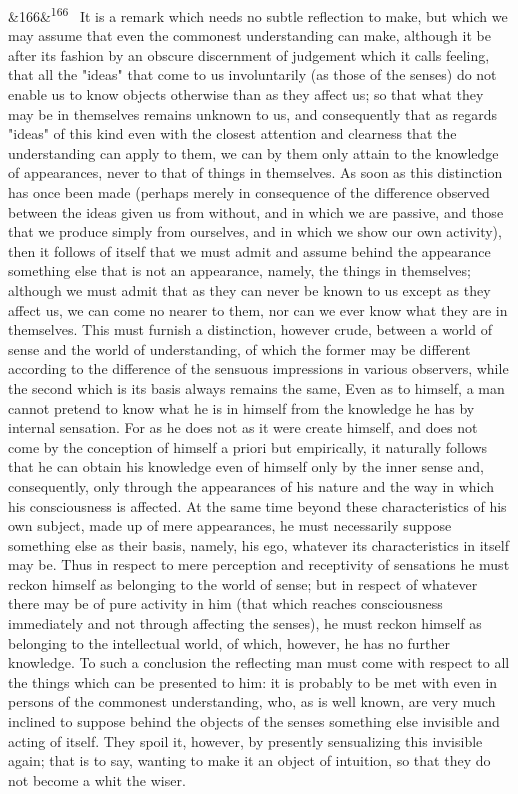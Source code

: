 \documentclass[12pt]{article}
\newcommand{\para}[1][]{\par\noindent\ifx&#1&\else\textsuperscript{\footnotesize #1}~\fi}
\begin{document}
\para[166] It is a remark which needs no subtle reflection to make, but which we may assume that even the commonest understanding can make, although it be after its fashion by an obscure discernment of judgement which it calls feeling, that all the "ideas" that come to us involuntarily (as those of the senses) do not enable us to know objects otherwise than as they affect us; so that what they may be in themselves remains unknown to us, and consequently that as regards "ideas" of this kind even with the closest attention and clearness that the understanding can apply to them, we can by them only attain to the knowledge of appearances, never to that of things in themselves. As soon as this distinction has once been made (perhaps merely in consequence of the difference observed between the ideas given us from without, and in which we are passive, and those that we produce simply from ourselves, and in which we show our own activity), then it follows of itself that we must admit and assume behind the appearance something else that is not an appearance, namely, the things in themselves; although we must admit that as they can never be known to us except as they affect us, we can come no nearer to them, nor can we ever know what they are in themselves. This must furnish a distinction, however crude, between a world of sense and the world of understanding, of which the former may be different according to the difference of the sensuous impressions in various observers, while the second which is its basis always remains the same, Even as to himself, a man cannot pretend to know what he is in himself from the knowledge he has by internal sensation. For as he does not as it were create himself, and does not come by the conception of himself a priori but empirically, it naturally follows that he can obtain his knowledge even of himself only by the inner sense and, consequently, only through the appearances of his nature and the way in which his consciousness is affected. At the same time beyond these characteristics of his own subject, made up of mere appearances, he must necessarily suppose something else as their basis, namely, his ego, whatever its characteristics in itself may be. Thus in respect to mere perception and receptivity of sensations he must reckon himself as belonging to the world of sense; but in respect of whatever there may be of pure activity in him (that which reaches consciousness immediately and not through affecting the senses), he must reckon himself as belonging to the intellectual world, of which, however, he has no further knowledge. To such a conclusion the reflecting man must come with respect to all the things which can be presented to him: it is probably to be met with even in persons of the commonest understanding, who, as is well known, are very much inclined to suppose behind the objects of the senses something else invisible and acting of itself. They spoil it, however, by presently sensualizing this invisible again; that is to say, wanting to make it an object of intuition, so that they do not become a whit the wiser.
\end{document}
